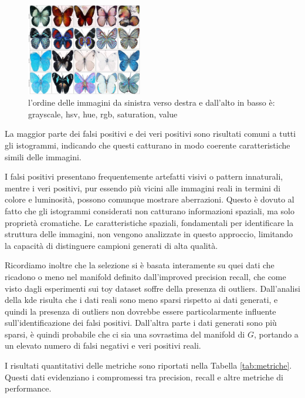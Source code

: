 \begin{figure}[!ht]
    \includegraphics[width=0.45\textwidth]{../images/realworldexperiments/butterflies/examples/fp_value_histogram.png}
    \caption{l'ordine delle immagini da sinistra verso destra e dall'alto in basso è: grayscale, hsv, hue, rgb, saturation, value}
\end{figure}

La maggior parte dei falsi positivi e dei veri positivi sono risultati comuni a tutti gli istogrammi, indicando che questi catturano in modo coerente caratteristiche simili delle immagini.

I falsi positivi presentano frequentemente artefatti visivi o pattern innaturali, mentre i veri positivi, pur essendo più vicini alle immagini reali in termini di colore e luminosità, possono comunque mostrare aberrazioni. Questo è dovuto al fatto che gli istogrammi considerati non catturano informazioni spaziali, ma solo proprietà cromatiche. Le caratteristiche spaziali, fondamentali per identificare la struttura delle immagini, non vengono analizzate in questo approccio, limitando la capacità di distinguere campioni generati di alta qualità.

Ricordiamo inoltre che la selezione si è basata interamente su quei dati che ricadono o meno nel manifold definito dall'improved precision recall, che come visto dagli esperimenti sui toy dataset soffre della presenza di outliers. Dall'analisi della kde risulta che i dati reali sono meno sparsi rispetto ai dati generati, e quindi la presenza di outliers non dovrebbe essere particolarmente influente sull'identificazione dei falsi positivi. Dall'altra parte i dati generati sono più sparsi, è quindi probabile che ci sia una sovrastima del manifold di \(G\), portando a un elevato numero di falsi negativi e veri positivi reali.

I risultati quantitativi delle metriche sono riportati nella Tabella \ref{tab:metriche}. Questi dati evidenziano i compromessi tra precision, recall e altre metriche di performance.

